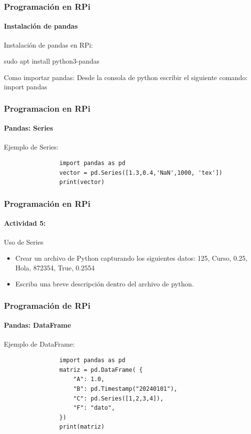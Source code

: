 \documentclass{beamer}
\begin{document}
	\begin{frame}[fragile]
		\frametitle{Programación en RPi}
		\framesubtitle{Instalación de pandas}
		\begin{mybox}{Instalación de pandas en RPi:}
			
				sudo apt install python3-pandas
			
		\end{mybox}
		\begin{mybox}{Como importar pandas:}
			Desde la consola de python escribir el siguiente comando:
			\newline
			import pandas
			
		\end{mybox}
	\end{frame}
	
	\begin{frame}[fragile]
		\frametitle{Programacion en RPi}
		\framesubtitle{Pandas: Series}
		\begin{mybox}{Ejemplo de Series:}
			\begin{lstlisting}
				import pandas as pd
				vector = pd.Series([1.3,0.4,'NaN',1000, 'tex'])
				print(vector)
			\end{lstlisting}
		\end{mybox}
	\end{frame}
	\begin{frame}
		\frametitle{Programación en RPi}
		\framesubtitle{Actividad 5:}
		\begin{mybox}{Uso de Series}
			\begin{itemize}
				\item Crear un archivo de Python capturando los siguientes datos: 125, Curso, 0.25, Hola, 872354, True, 0.2554
				\item Escriba una breve descripción dentro del archivo de python.
			\end{itemize}
		\end{mybox}
	\end{frame}
	\begin{frame}[fragile]
		\frametitle{Programación de RPi}
		\framesubtitle{Pandas: DataFrame}
		\begin{mybox}{Ejemplo de DataFrame:}
			\begin{lstlisting}
				import pandas as pd
				matriz = pd.DataFrame( {
					"A": 1.0,
					"B": pd.Timestamp("20240101"),
					"C": pd.Series([1,2,3,4]),
					"F": "dato",
				})
				print(matriz)
			\end{lstlisting}
		\end{mybox}
	\end{frame}
	
\end{document}

